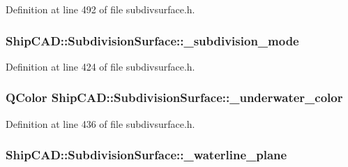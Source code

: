 Definition at line 492 of file subdivsurface.\+h.

\subsubsection[{\texorpdfstring{\+\_\+subdivision\+\_\+mode}{_subdivision_mode}}]{ Ship\+C\+A\+D\+::\+Subdivision\+Surface\+::\+\_\+subdivision\+\_\+mode\hspace{0.3cm}{\ttfamily [protected]}}\hypertarget{classShipCAD_1_1SubdivisionSurface_a0af5c881dfa24574962f42d80da997ee}{}\label{classShipCAD_1_1SubdivisionSurface_a0af5c881dfa24574962f42d80da997ee}


Definition at line 424 of file subdivsurface.\+h.

\subsubsection[{\texorpdfstring{\+\_\+underwater\+\_\+color}{_underwater_color}}]{\setlength{\rightskip}{0pt plus 5cm}Q\+Color Ship\+C\+A\+D\+::\+Subdivision\+Surface\+::\+\_\+underwater\+\_\+color\hspace{0.3cm}{\ttfamily [protected]}}\hypertarget{classShipCAD_1_1SubdivisionSurface_a8a64eabb53fa0facaa6e59579305328b}{}\label{classShipCAD_1_1SubdivisionSurface_a8a64eabb53fa0facaa6e59579305328b}


Definition at line 436 of file subdivsurface.\+h.

\subsubsection[{\texorpdfstring{\+\_\+waterline\+\_\+plane}{_waterline_plane}}]{ Ship\+C\+A\+D\+::\+Subdivision\+Surface\+::\+\_\+waterline\+\_\+plane\hspace{0.3cm}{\ttfamily [protected]}}\hypertarget{classShipCAD_1_1SubdivisionSurface_a762de21a330588c7bfbe081637cab2f3}{}\label{classShipCAD_1_1SubdivisionSurface_a762de21a330588c7bfbe081637cab2f3}


